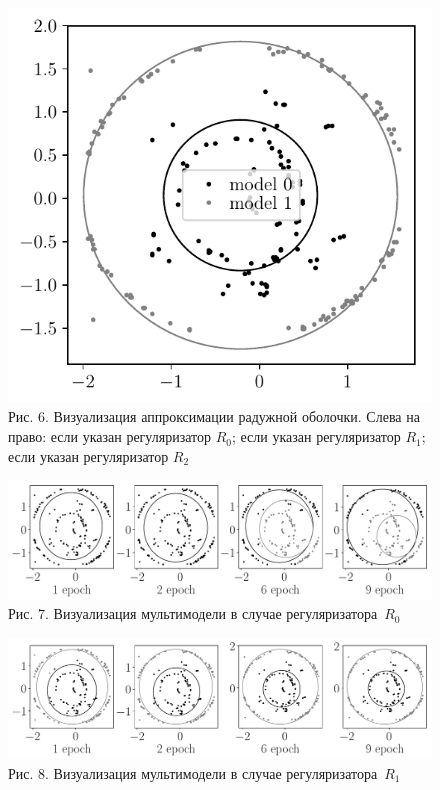 \documentclass[12pt]{a&t}
\begin{document}
\begin{figure}[h!]
\begin{center}
	\includegraphics[height = 0.17\textheight]{prior_regular_real_example}
\end{center}
\caption{Рис. 6. Визуализация аппроксимации радужной оболочки. Слева на право: если указан регуляризатор $R_0$; если указан регуляризатор $R_1$; если указан регуляризатор $R_2$}
\label{ce:fig6-1}
\end{figure}

\begin{figure}[h!]
\begin{center}
     \includegraphics[width=\textwidth]{experiment_real_not_prior}
\end{center}
     \caption{Рис. 7. Визуализация мультимодели в случае регуляризатора~$R_0$}
    \label{ce:fig7}
\end{figure}

\begin{figure}[h!]
\begin{center}
     \includegraphics[width=\textwidth]{experiment_real_prior}
\end{center}
     \caption{Рис. 8. Визуализация мультимодели в случае регуляризатора~$R_1$}
    \label{ce:fig8}
\end{figure}
\end{document}
